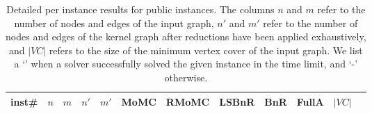 \documentclass[twoside,leqno,twocolumn]{article}
\newcommand{\AlgName}[1]{\textsf{#1}}
\begin{document}
\begin{table}
\centering
\caption{Detailed per instance results for public instances. The columns $n$ and $m$ refer to the number of nodes and edges of the input graph, $n'$ and $m'$ refer to the number of nodes and edges of the kernel graph after reductions have been applied exhaustively, and $|VC|$ refers to the size of the minimum vertex cover of the input graph. We list a `\checkmark' when a solver successfully solved the given instance in the time limit, and `-' otherwise.}
\label{tab:detailedresults1}
\begin{tabular}{l@{\hskip 25pt} rrrr|ccccc|rc}
\toprule
inst\# & $n$ &$m$& $n'$& $m'$ & \AlgName{MoMC} & \AlgName{RMoMC} & \AlgName{LSBnR} & \AlgName{BnR} & \AlgName{FullA} & $|VC|$ \\
                \midrule


\end{tabular}
\end{table}
\end{document}
